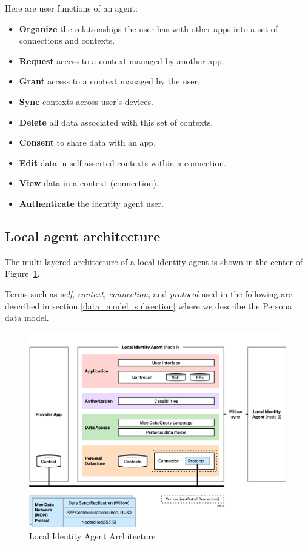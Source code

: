 \documentclass[11pt, oneside]{article}   	%
\begin{document}
Here are user functions of an agent:

\begin{itemize}
\item \textbf{Organize} the relationships the user has with other apps into a set of connections and contexts.
\item \textbf{Request} access to a context managed by another app.
\item \textbf{Grant} access to a context managed by the user.
\item \textbf{Sync} contexts across user's devices.
\item \textbf{Delete} all data associated with this set of contexts.
\item \textbf{Consent} to share data with an app.
\item \textbf{Edit} data in self-asserted contexts within a connection.
\item \textbf{View} data in a context (connection).
\item \textbf{Authenticate} the identity agent user.
\end{itemize}

\subsection{Local agent architecture}

The multi-layered architecture of a local identity agent is shown in the center of Figure~\ref{fig:architecture}. 

Terms such as \emph{self}, \emph{context}, \emph{connection}, and \emph{protocol} used in the following are described in section \ref{data_model_subsection} where we describe the Persona data model.

\begin{figure}[htbp]
\includegraphics[width=\textwidth]{./images/architecture.png}
\caption{Local Identity Agent Architecture}
\label{fig:architecture}
\end{figure}
\end{document}
